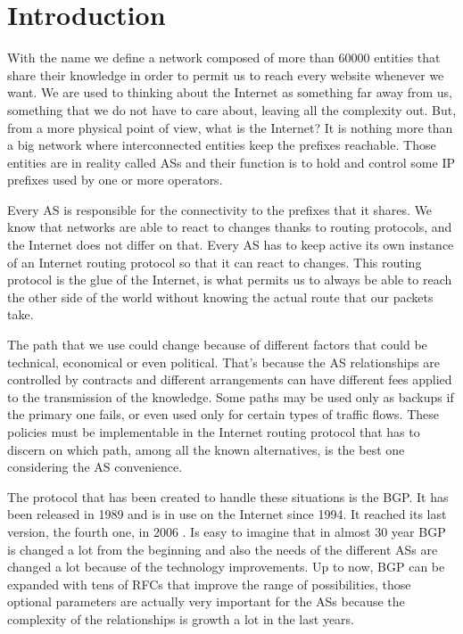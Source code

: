 \chapter{Introduction}
\label{cha:introduction}



With the name  we define a network composed of more than \num{60000}
entities that share their knowledge in order to permit us to reach every website
whenever we want.
We are used to thinking about the Internet as something far away from us, something
that we do not have to care about, leaving all the complexity
out.
But, from a more physical point of view, what is the Internet? It is nothing
more than a big network where interconnected entities keep the prefixes reachable.
Those entities are in reality called \acp{AS} and their function is to hold and
control some \ac{IP} prefixes used by one or more operators.

Every \ac{AS} is responsible for the connectivity to the prefixes that it shares.
We know that networks are able to react to changes thanks to routing protocols,
and the Internet does not differ on that.
Every \ac{AS} has to keep active its own instance of an Internet routing protocol
so that it can react to changes.
This routing protocol is the glue of the Internet, is what permits
us to always be able to reach the other side of the world without knowing
the actual route that our packets take.

The path that we use could change because of different factors that could
be technical, economical or even political.
That's because the \ac{AS} relationships are controlled by contracts and different
arrangements can have different fees applied to the transmission of the knowledge.
Some paths may be used only as backups if the primary one fails, or even used
only for certain types of traffic flows.
These policies must be implementable in the Internet routing protocol that has
to discern on which path, among all the known alternatives, is the best one
considering the \ac{AS} convenience.

The protocol that has been created to handle these situations is the \ac{BGP}.
It has been released in \num{1989} and is in use on the Internet since \num{1994}.
It reached its last version, the fourth one, in \num{2006} \cite{rfc4271}.
Is easy to imagine that in almost \num{30} year \ac{BGP} is changed a lot from
the beginning and also the needs of the different \acp{AS} are changed a lot
because of the technology improvements.
Up to now, \ac{BGP} can be expanded with tens of \acp{RFC} that improve the
range of possibilities, those optional parameters are actually very important
for the \acp{AS} because the complexity of the relationships is growth a lot
in the last years.

